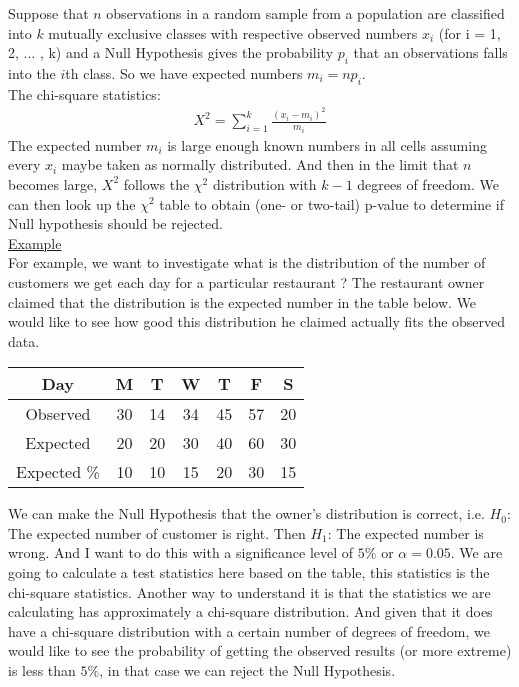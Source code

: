 Suppose that $n$ observations in a random sample from a population are classified into $k$ mutually exclusive classes with respective observed numbers $x_i$ (for i = 1, 2, ... , k) and a Null Hypothesis gives the probability $p_i$ that an observations falls into the $i$th class. So we have expected numbers $m_i = np_i $.\\

The chi-square statistics:
\begin{eqnarray}
X^2 = \sum_{i=1}^{k} \frac{(x_i - m_i)^2}{m_i}
\end{eqnarray}
The expected number $m_i$ is large enough known numbers in all cells assuming every $x_i$ maybe taken as normally distributed. And then in the limit that $n$ becomes large, $X^2$ follows the $\chi^2$ distribution with $k-1$ degrees of freedom. We can then look up the $\chi^2$ table to obtain (one- or two-tail) p-value to determine if Null hypothesis should be rejected. \\

\underline{Example}\\

For example, we want to investigate what is the distribution of the number of customers we get each day for a particular restaurant ? The restaurant owner claimed that the distribution is the expected number in the table below. We would like to see how good this distribution he claimed actually fits the observed data. \\

\begin{table}[h!]
\begin{tabular}{|c|c|c|c|c|c|c|}
\hline
Day         & M  & T  & W  & T  & F  & S  \\ \hline
Observed    & 30 & 14 & 34 & 45 & 57 & 20 \\ \hline
Expected    & 20 & 20 & 30 & 40 & 60 & 30 \\ \hline
Expected \% & 10 & 10 & 15 & 20 & 30 & 15 \\ \hline
\end{tabular}
\end{table}

We can make the Null Hypothesis that the owner's distribution is correct, i.e. $H_0$: The expected number of customer is right. Then $H_1$: The expected number is wrong. And I want to do this with a significance level of $5\%$ or $\alpha = 0.05$. We are going to calculate a test statistics here based on the table, this statistics is the chi-square statistics.  Another way to understand it is that the statistics we are calculating has approximately a chi-square distribution. And given that it does have a chi-square distribution with a certain number of degrees of freedom, we would like to see the probability of getting the observed results (or more extreme) is less than $5\%$, in that case we can reject the Null Hypothesis. \\

